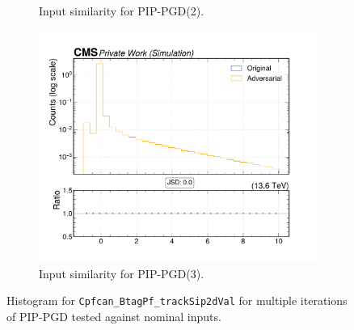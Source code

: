 \begin{figure}[htbp]
\begin{subfigure}[t]{0.32\textwidth}
    \caption*{Input similarity for PIP-PGD(2).}
  \end{subfigure}\hfill
  \begin{subfigure}[t]{0.32\textwidth}
    \includegraphics[width=\linewidth]{media/output/features/compare/combined_it_3/cmp_cpf_arr_Cpfcan_BtagPf_trackSip2dVal.pdf}
    \caption*{Input similarity for PIP-PGD(3).}
  \end{subfigure}

  \caption*{Histogram for \texttt{Cpfcan\_BtagPf\_trackSip2dVal} for multiple iterations of PIP-PGD tested against nominal inputs.}
  \label{fig:combined_input_Cpfcan_BtagPf_trackSip2dVal}
\end{figure}

